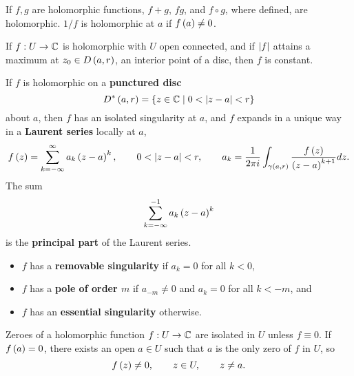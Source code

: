 \begin{remark}
If $ f, g $ are holomorphic functions, $ f + g $, $ fg $, and $ f \circ g $, where defined, are holomorphic. $ 1 / f $ is holomorphic at $ a $ if $ f\left( a \right) \ne 0 $.
\end{remark}

\begin{theorem}
If $ f : U \to \mathbb{C} $ is holomorphic with $ U $ open connected, and if $ \left\lvert f \right\rvert $ attains a maximum at $ z_0 \in D\left( a, r \right) $, an interior point of a disc, then $ f $ is constant.
\end{theorem}

\begin{remark}
If $ f $ is holomorphic on a \textbf{punctured disc}
$$ D^*\left( a, r \right) = \left\{ z \in \mathbb{C} \mid 0 < \left\lvert z - a \right\rvert < r \right\} $$
about $ a $, then $ f $ has an isolated singularity at $ a $, and $ f $ expands in a unique way in a \textbf{Laurent series} locally at $ a $,
$$ f\left( z \right) = \sum_{k = -\infty}^\infty a_k\left( z - a \right)^k, \qquad 0 < \left\lvert z - a \right\rvert < r, \qquad a_k = \dfrac{1}{2\pi i} \int_{\gamma\left( a, r \right)} \dfrac{f\left( z \right)}{\left( z - a \right)^{k + 1}} dz. $$
The sum
$$ \sum_{k = -\infty}^{-1} a_k\left( z - a \right)^k $$
is the \textbf{principal part} of the Laurent series.
\begin{itemize}
\item $ f $ has a \textbf{removable singularity} if $ a_k = 0 $ for all $ k < 0 $,
\item $ f $ has a \textbf{pole of order $ m $} if $ a_{-m} \ne 0 $ and $ a_k = 0 $ for all $ k < -m $, and
\item $ f $ has an \textbf{essential singularity} otherwise.
\end{itemize}
\end{remark}

\pagebreak


\begin{theorem}
Zeroes of a holomorphic function $ f : U \to \mathbb{C} $ are isolated in $ U $ unless $ f \equiv 0 $. If $ f\left( a \right) = 0 $, there exists an open $ a \in U $ such that $ a $ is the only zero of $ f $ in $ U $, so
$$ f\left( z \right) \ne 0, \qquad z \in U, \qquad z \ne a. $$
\end{theorem}

